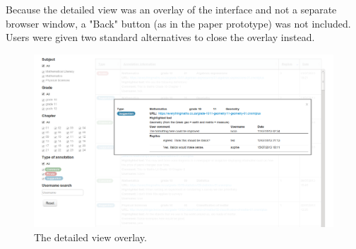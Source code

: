 Because the detailed view was an overlay of the interface and not a separate browser window, a "Back" button (as in the paper prototype) was not included. Users were given two standard alternatives to close the overlay instead. 

\begin{figure}[h!]
    \centering
    \includegraphics[width=\textwidth]{Figures/V1/detailedview.png}
 \caption{The detailed view overlay.}
 \label{fig:detailedview}

\end{figure}

